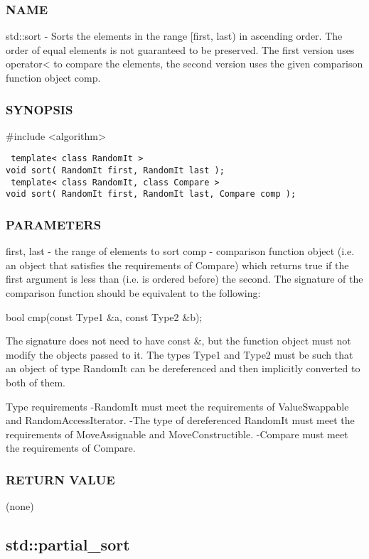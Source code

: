 \subsubsection{NAME}
std::sort - Sorts the elements in the range [first, last) in ascending order. The order of equal elements is not guaranteed to be preserved. The first version uses operator< to compare the elements, the second version uses the given comparison function object comp.

\subsubsection{SYNOPSIS}
\#include <algorithm>

\begin{lstlisting}
 template< class RandomIt >
void sort( RandomIt first, RandomIt last );
 template< class RandomIt, class Compare >
void sort( RandomIt first, RandomIt last, Compare comp );
\end{lstlisting}

\subsubsection{PARAMETERS}
first, last - the range of elements to sort
comp - comparison function object (i.e. an object that satisfies the requirements of Compare) which returns true if the first argument is less than (i.e. is ordered before) the second.
The signature of the comparison function should be equivalent to the following:

 bool cmp(const Type1 \&a, const Type2 \&b);

The signature does not need to have const \&, but the function object must not modify the objects passed to it.
The types Type1 and Type2 must be such that an object of type RandomIt can be dereferenced and then implicitly converted to both of them.

 Type requirements
 -RandomIt must meet the requirements of ValueSwappable and RandomAccessIterator.
 -The type of dereferenced RandomIt must meet the requirements of MoveAssignable and MoveConstructible.
 -Compare must meet the requirements of Compare.

\subsubsection{RETURN VALUE}
(none)



\subsection{std::partial\_sort}

